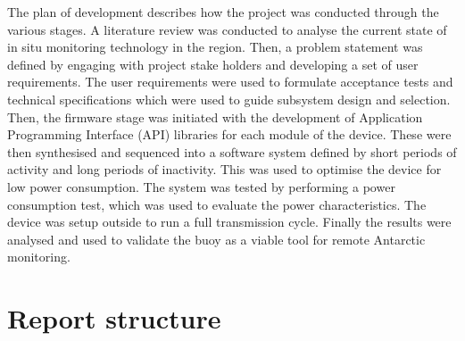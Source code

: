 The plan of development describes how the project was conducted through the various stages. A literature review was conducted to analyse the current state of in situ monitoring technology in the region. Then, a problem statement was defined by engaging with project stake holders and developing a set of user requirements. The user requirements were used to formulate acceptance tests and technical specifications which were used to guide subsystem design and selection. Then, the firmware stage was initiated with the development of Application Programming Interface (API) libraries for each module of the device. These were then synthesised and sequenced into a software system defined by short periods of activity and long periods of inactivity. This was used to optimise the device for low power consumption. The system was tested by performing a power consumption test, which was used to evaluate the power characteristics. The device was setup outside to run a full transmission cycle. Finally the results were analysed and used to validate the buoy as a viable tool for remote Antarctic monitoring.
\section{Report structure}

